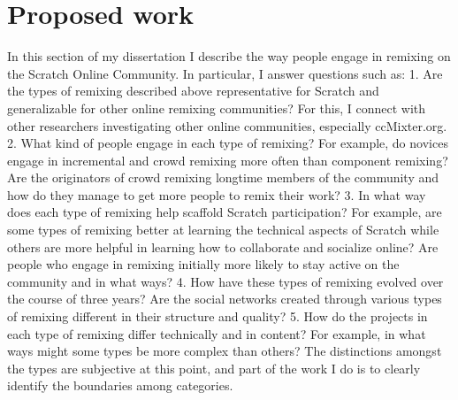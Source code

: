 \section{Proposed work}
In this section of my dissertation I  describe the way people engage in remixing on the Scratch Online Community. 
In particular, I  answer questions such as:
1. Are the types of remixing described above representative for Scratch and generalizable for other online remixing communities? 
For this, I  connect with other researchers investigating other online communities, especially ccMixter.org.
2. What kind of people engage in each type of remixing? For example, do novices engage in incremental and crowd remixing more often than component remixing? Are the originators of crowd remixing longtime members of the community and how do they manage to get more people to remix their work?
3. In what way does each type of remixing help scaffold Scratch participation? For example, are some types of remixing better at learning the technical aspects of Scratch while others are more helpful in learning how to collaborate and socialize online? Are people who engage in remixing initially more likely to stay active on the community and in what ways?
4. How have these types of remixing evolved over the course of three years?
Are the social networks created through various types of remixing different in their structure and quality?
5. How do the projects in each type of remixing differ technically and in content? For example, in what ways might some types be more complex than others?
The distinctions amongst the types are subjective at this point, and part of the work I  do is to clearly identify the boundaries among categories.

